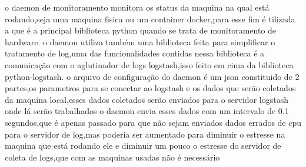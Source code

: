 \documentclass[
	12pt,				%
	openright,			%
	oneside,			%
	a4paper,			%
	english,			%
	french,				%
	spanish,			%
	brazil,				%
	]{abntex2}
\begin{document}
o daemon de monitoramento monitora os status da maquina na qual está rodando,seja uma maquina fisica ou um container docker,para esse fim é tilizada a  que é a principal biblioteca python quando se trata de monitoramento de hardware.
o daemon utiliza também uma biblioteca feita para simplificar o tratamento de log,uma das funcionalidades contidas nessa biblioteca é a comunicação com o aglutinador de logs logstash,isso feito em cima da biblioteca python-logstash.
o arquivo de configuração do daemon é um json constituido de 2 partes,os parametros para se conectar ao logstash e os dados que serão coletados da maquina local,esses dados coletados serão enviados para o servidor logstash onde lá serão trabalhados
o daemon envia esses dados com um intervalo de 0.1 segundos,que é apenas passado para que não sejam enviados dados errados de cpu para o servidor de log,mas poderia ser aumentado para diminuir o estresse na maquina que está rodando ele e diminuir um pouco o estresse do servidor de coleta de logs,que com as maquinas usadas não é necessário
\end{document}
